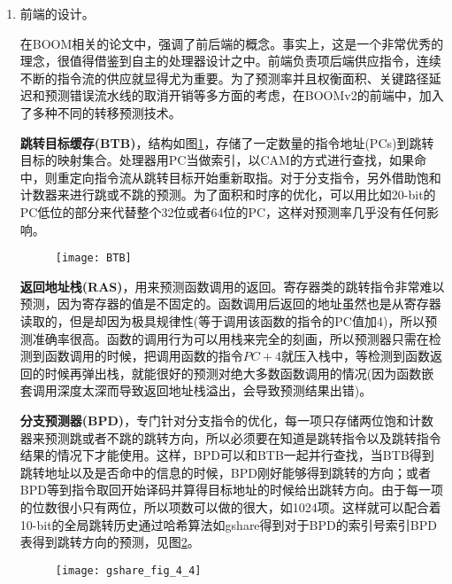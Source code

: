 \begin{enumerate}[label=(\alph*)]
	\item 前端的设计。
	
	在BOOM相关的论文\citep{Celio:EECS-2017-157,Celio:EECS-2018-151}中，强调了前后端的概念。事实上，这是一个非常优秀的理念，很值得借鉴到自主的处理器设计之中。前端负责项后端供应指令，连续不断的指令流的供应就显得尤为重要。为了预测率并且权衡面积、关键路径延迟和预测错误流水线的取消开销等多方面的考虑，在BOOMv2的前端中，加入了多种不同的转移预测技术。
	
	\textbf{跳转目标缓存(BTB)}，结构如图\ref{fig:BTB}，存储了一定数量的指令地址(PCs)到跳转目标的映射集合。处理器用PC当做索引，以CAM的方式进行查找，如果命中，则重定向指令流从跳转目标开始重新取指。对于分支指令，另外借助饱和计数器来进行跳或不跳的预测。为了面积和时序的优化，可以用比如20-bit的PC低位的部分来代替整个32位或者64位的PC\citep{Celio:EECS-2017-157}，这样对预测率几乎没有任何影响。
	\begin{figure}[!htbp]
		\centering
		\texttt{[image: BTB]}
		\label{fig:BTB}
	\end{figure}

	\textbf{返回地址栈(RAS)}，用来预测函数调用的返回。寄存器类的跳转指令非常难以预测，因为寄存器的值是不固定的。函数调用后返回的地址虽然也是从寄存器读取的，但是却因为极具规律性(等于调用该函数的指令的PC值加4)，所以预测准确率很高。函数的调用行为可以用栈来完全的刻画，所以预测器只需在检测到函数调用的时候，把调用函数的指令$ PC+4 $就压入栈中，等检测到函数返回的时候再弹出栈，就能很好的预测对绝大多数函数调用的情况(因为函数嵌套调用深度太深而导致返回地址栈溢出，会导致预测结果出错)。
	
	\textbf{分支预测器(BPD)}，专门针对分支指令的优化，每一项只存储两位饱和计数器来预测跳或者不跳的跳转方向，所以必须要在知道是跳转指令以及跳转指令结果的情况下才能使用。这样，BPD可以和BTB一起并行查找，当BTB得到跳转地址以及是否命中的信息的时候，BPD刚好能够得到跳转的方向；或者BPD等到指令取回开始译码并算得目标地址的时候给出跳转方向。由于每一项的位数很小只有两位，所以项数可以做的很大，如1024项。这样就可以配合着10-bit的全局跳转历史通过哈希算法如gshare得到对于BPD的索引号索引BPD表得到跳转方向的预测，见图\ref{fig:gshare}。
	
	\begin{figure}[!htbp]
		\centering
		\texttt{[image: gshare\_fig\_4\_4]}
		\label{fig:gshare}
	\end{figure}


\end{enumerate}
